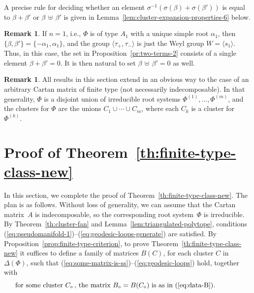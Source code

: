 \documentclass[letterpaper]{amsart}
\numberwithin{equation}{section}
\theoremstyle{definition}
\newtheorem{remark}[theorem]{Remark}
\def\subplus{{\,\uplus\,} }
\begin{document}
A precise rule for deciding whether an element $\sigma^{-1} (\sigma (\beta) + 
\sigma (\beta'))$ is equal to $\beta+\beta'$ or $\beta\subplus\beta'$ 
is given in Lemma~\ref{lem:cluster-expansion-properties-6} below. 
 
\begin{remark} 
If $n =1$, i.e., $\Phi$ is of type $A_1$ with a unique simple root 
$\alpha_1$, then $\{\beta, \beta'\} = \{- \alpha_1, \alpha_1\}$, 
and the group $\langle \tau_+, \tau_- \rangle$ is just the 
Weyl group $W = \langle s_1 \rangle$. 
Thus, in this case, the set 
in Proposition~\ref{pr:two-terms-2} consists of a single element $\beta + \beta' = 0$. 
It is then natural to set $\beta \subplus \beta' = 0$ as well. 
\end{remark} 
 
 
\begin{remark} 
\label{rem:allow-decomposable} 
All results in this section extend in an obvious way to the 
case of an arbitrary Cartan matrix of finite type (not 
necessarily indecomposable). 
In that generality, $\Phi$ is a disjoint 
union of irreducible root systems $\Phi^{(1)}, \dots, \Phi^{(m)}$, and 
the clusters for $\Phi$ are the unions 
$C_1 \cup \cdots \cup C_m$, where each $C_k$ is a cluster for $\Phi^{(k)}$. 
\end{remark} 
 
 
\section{Proof of Theorem~\ref{th:finite-type-class-new}} 
\label{sec:construction-of-finite-type} 
 
In this section, we complete the proof of 
Theorem~\ref{th:finite-type-class-new}. 
The plan is as follows. 
Without loss of generality, we can assume that 
the Cartan matrix~$A$ is indecomposable, so the corresponding 
root system~$\Phi$ is irreducible. 
By Theorem~\ref{th:cluster-fan} 
and Lemma~\ref{lem:triangulated-polytope}, 
conditions 
(\ref{eq:pseudomanifold-1})--(\ref{eq:geodesic-loops-generate}) 
are satisfied. 
By Proposition~\ref{prop:finite-type-criterion}, 
to prove Theorem~\ref{th:finite-type-class-new} it suffices 
to define a family of matrices $B(C)$, 
for each cluster $C$ in~$\Delta(\Phi)$, 
such that (\ref{eq:some-matrix-is-ss})--(\ref{eq:geodesic-loops}) 
hold, together with 
\begin{equation} 
\label{eq:some-is-ss-a} 
\text{for some cluster $C_\circ\,$, the matrix $B_\circ=B(C_\circ)$ is 
as in (\ref{eq:data-B}).} 
\hspace{.5in} 
\end{equation} 
 
\end{document}
